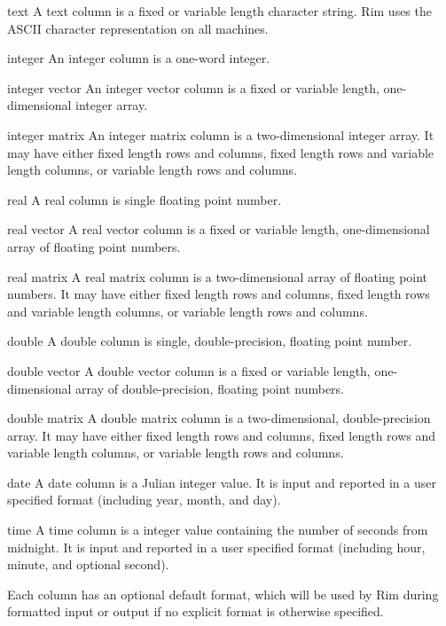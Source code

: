 \begin{List}
\item[text] A text column is a fixed or variable length
   character string.  Rim uses the ASCII character representation
   on all machines.
\item[integer] An integer column is a one-word integer.
\item[integer vector] An integer vector column is
   a fixed or variable length, one-dimensional integer array.
\item[integer matrix] An integer matrix column is
   a two-dimensional integer array.  It may have either
   fixed length rows and columns, fixed length rows and variable
   length columns, or variable length rows and columns.
\item[real] A real column is single
   floating point number.
\item[real vector] A real vector column is
   a fixed or variable length, one-di\-men\-sional
   array of floating point numbers.
\item[real matrix] A real matrix column is
   a two-dimensional array of floating point numbers.
   It may have either
   fixed length rows and columns, fixed length rows and variable
   length columns, or variable length rows and columns.
\item[double] A double column is single,
   double-precision, floating point number.
\item[double vector] A double vector column is
   a fixed or variable length, one-dimensional array of
   double-precision, floating point numbers.
\item[double matrix] A double matrix column is
   a two-dimensional, double-precision array.  It may have either
   fixed length rows and columns, fixed length rows and variable
   length columns, or variable length rows and columns.
\item[date] A date column is a Julian integer value.
   It is input and reported in a user specified format
   (including year, month, and day).
\item[time] A time column is a integer value containing
   the number of seconds from midnight.
   It is input and reported in a user specified format
   (including hour, minute, and optional second).
\end{List}
 
Each column has an optional default format, which will be used
by Rim during formatted input or output if no explicit
format is otherwise specified.
 
